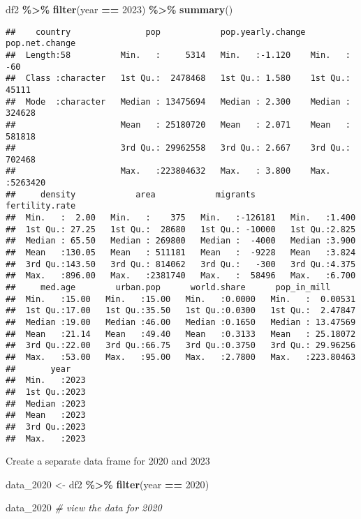 \documentclass[
]{article}
\newenvironment{Shaded}{\begin{snugshade}}{\end{snugshade}}
\newcommand{\CommentTok}[1]{\textcolor[rgb]{0.56,0.35,0.01}{\textit{#1}}}
\newcommand{\DecValTok}[1]{\textcolor[rgb]{0.00,0.00,0.81}{#1}}
\newcommand{\FunctionTok}[1]{\textcolor[rgb]{0.13,0.29,0.53}{\textbf{#1}}}
\newcommand{\NormalTok}[1]{#1}
\newcommand{\OtherTok}[1]{\textcolor[rgb]{0.56,0.35,0.01}{#1}}
\newcommand{\SpecialCharTok}[1]{\textcolor[rgb]{0.81,0.36,0.00}{\textbf{#1}}}
\begin{document}
\begin{Shaded}
\begin{Highlighting}[]
\NormalTok{df2 }\SpecialCharTok{\%\textgreater{}\%} 
  \FunctionTok{filter}\NormalTok{(year }\SpecialCharTok{==} \DecValTok{2023}\NormalTok{) }\SpecialCharTok{\%\textgreater{}\%} 
  \FunctionTok{summary}\NormalTok{()}
\end{Highlighting}
\end{Shaded}

\begin{verbatim}
##    country               pop            pop.yearly.change pop.net.change   
##  Length:58          Min.   :     5314   Min.   :-1.120    Min.   :    -60  
##  Class :character   1st Qu.:  2478468   1st Qu.: 1.580    1st Qu.:  45111  
##  Mode  :character   Median : 13475694   Median : 2.300    Median : 324628  
##                     Mean   : 25180720   Mean   : 2.071    Mean   : 581818  
##                     3rd Qu.: 29962558   3rd Qu.: 2.667    3rd Qu.: 702468  
##                     Max.   :223804632   Max.   : 3.800    Max.   :5263420  
##     density            area            migrants       fertility.rate 
##  Min.   :  2.00   Min.   :    375   Min.   :-126181   Min.   :1.400  
##  1st Qu.: 27.25   1st Qu.:  28680   1st Qu.: -10000   1st Qu.:2.825  
##  Median : 65.50   Median : 269800   Median :  -4000   Median :3.900  
##  Mean   :130.05   Mean   : 511181   Mean   :  -9228   Mean   :3.824  
##  3rd Qu.:143.50   3rd Qu.: 814062   3rd Qu.:   -300   3rd Qu.:4.375  
##  Max.   :896.00   Max.   :2381740   Max.   :  58496   Max.   :6.700  
##     med.age        urban.pop      world.share      pop_in_mill       
##  Min.   :15.00   Min.   :15.00   Min.   :0.0000   Min.   :  0.00531  
##  1st Qu.:17.00   1st Qu.:35.50   1st Qu.:0.0300   1st Qu.:  2.47847  
##  Median :19.00   Median :46.00   Median :0.1650   Median : 13.47569  
##  Mean   :21.14   Mean   :49.40   Mean   :0.3133   Mean   : 25.18072  
##  3rd Qu.:22.00   3rd Qu.:66.75   3rd Qu.:0.3750   3rd Qu.: 29.96256  
##  Max.   :53.00   Max.   :95.00   Max.   :2.7800   Max.   :223.80463  
##       year     
##  Min.   :2023  
##  1st Qu.:2023  
##  Median :2023  
##  Mean   :2023  
##  3rd Qu.:2023  
##  Max.   :2023
\end{verbatim}

Create a separate data frame for 2020 and 2023

\begin{Shaded}
\begin{Highlighting}[]
\NormalTok{data\_2020 }\OtherTok{\textless{}{-}}\NormalTok{ df2 }\SpecialCharTok{\%\textgreater{}\%} 
  \FunctionTok{filter}\NormalTok{(year }\SpecialCharTok{==} \DecValTok{2020}\NormalTok{)}

\NormalTok{data\_2020 }\CommentTok{\# view the data for 2020}
\end{Highlighting}
\end{Shaded}
\end{document}
